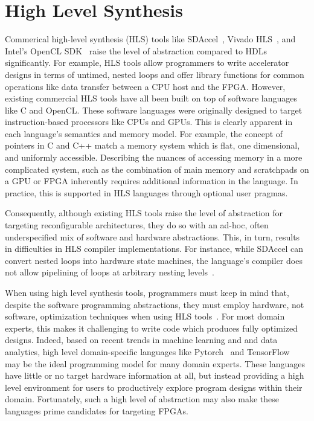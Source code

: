 \section{High Level Synthesis}
Commerical high-level synthesis (HLS) tools like SDAccel~\cite{sdaccel}, Vivado HLS~\cite{vivadohls},
and Intel's OpenCL SDK~\cite{opencl_sdk} raise the level of abstraction compared to HDLs significantly.
For example, HLS tools allow programmers to write accelerator designs in terms of untimed, nested loops
and offer library functions for common operations like data transfer between a CPU host and the FPGA.
However, existing commercial HLS tools have all been built on top of software languages like C and OpenCL.
These software languages were originally designed to target instruction-based processors like CPUs and GPUs.
This is clearly apparent in each language's semantics and memory model.
For example, the concept of pointers in C and C++ match a memory system which is flat, one dimensional, and uniformly accessible.
Describing the nuances of accessing memory in a more complicated system, such as the combination of main memory and
scratchpads on a GPU or FPGA inherently requires additional information in the language.
In practice, this is supported in HLS languages through optional user pragmas.

Consequently, although existing HLS tools raise the level of abstraction for targeting reconfigurable architectures,
they do so with an ad-hoc, often underspecified mix of software and hardware abstractions.
This, in turn, results in difficulties in HLS compiler implementations.
For instance, while SDAccel can convert nested loops into hardware state machines,
the language's compiler does not allow pipelining of loops at arbitrary nesting levels~\cite{vivado_userguide}.

When using high level synthesis tools, programmers must keep in mind that,
despite the software programming abstractions, they must employ hardware,
not software, optimization techniques when using HLS tools~\cite{nane2016survey}.
For most domain experts, this makes it challenging to write code which produces fully optimized designs.
Indeed, based on recent trends in machine learning and and data analytics, high level
domain-specific languages like Pytorch~\cite{pytorch} and TensorFlow~\cite{tensorflow} may be
the ideal programming model for many domain experts.
These languages have little or no target hardware information at all, but
instead providing a high level environment for users to productively explore
program designs within their domain. Fortunately, such a high level of abstraction
may also make these languages prime candidates for targeting FPGAs.

